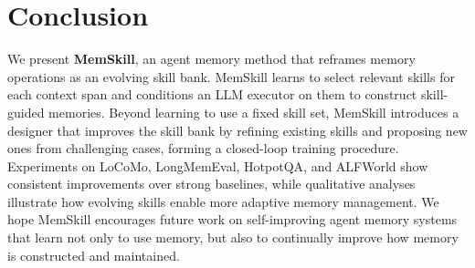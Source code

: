 \section{Conclusion}\label{sec:conclusion}

We present \textbf{MemSkill}, an agent memory method that reframes memory operations as an evolving skill bank. MemSkill learns to select relevant skills for each context span and conditions an LLM executor on them to construct skill-guided memories. Beyond learning to use a fixed skill set, MemSkill introduces a designer that improves the skill bank by refining existing skills and proposing new ones from challenging cases, forming a closed-loop training procedure. Experiments on LoCoMo, LongMemEval, HotpotQA, and ALFWorld show consistent improvements over strong baselines, while qualitative analyses illustrate how evolving skills enable more adaptive memory management. We hope MemSkill encourages future work on self-improving agent memory systems that learn not only to use memory, but also to continually improve how memory is constructed and maintained.



















